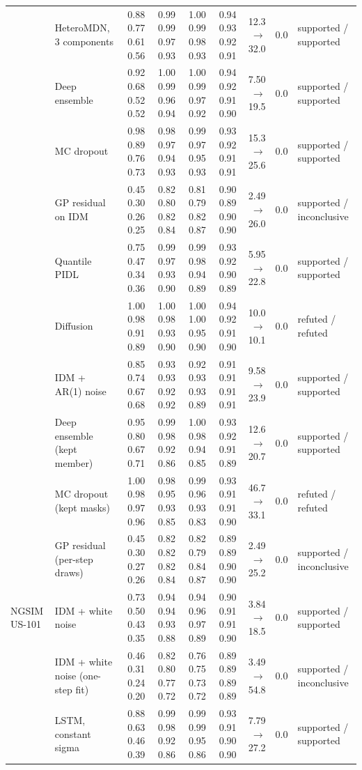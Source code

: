 \begin{longtable}{llrrrrrrl}
 & HeteroMDN, 3 components & 0.88 0.77 0.61 0.56 & 0.99 0.99 0.97 0.93 & 1.00 0.99 0.98 0.93 & 0.94 0.93 0.92 0.91 & 12.3 $\rightarrow$ 32.0 & 0.0 & supported / supported \\
 & Deep ensemble & 0.92 0.68 0.52 0.52 & 1.00 0.99 0.96 0.94 & 1.00 0.99 0.97 0.92 & 0.94 0.92 0.91 0.90 & 7.50 $\rightarrow$ 19.5 & 0.0 & supported / supported \\
 & MC dropout & 0.98 0.89 0.76 0.73 & 0.98 0.97 0.94 0.93 & 0.99 0.97 0.95 0.93 & 0.93 0.92 0.91 0.91 & 15.3 $\rightarrow$ 25.6 & 0.0 & supported / supported \\
 & GP residual on IDM & 0.45 0.30 0.26 0.25 & 0.82 0.80 0.82 0.84 & 0.81 0.79 0.82 0.87 & 0.90 0.89 0.90 0.90 & 2.49 $\rightarrow$ 26.0 & 0.0 & supported / inconclusive \\
 & Quantile PIDL & 0.75 0.47 0.34 0.36 & 0.99 0.97 0.93 0.90 & 0.99 0.98 0.94 0.89 & 0.93 0.92 0.90 0.89 & 5.95 $\rightarrow$ 22.8 & 0.0 & supported / supported \\
 & Diffusion & 1.00 0.98 0.91 0.89 & 1.00 0.98 0.93 0.90 & 1.00 1.00 0.95 0.90 & 0.94 0.92 0.91 0.90 & 10.0 $\rightarrow$ 10.1 & 0.0 & refuted / refuted \\
 & IDM + AR(1) noise & 0.85 0.74 0.67 0.68 & 0.93 0.93 0.92 0.92 & 0.92 0.93 0.93 0.89 & 0.91 0.91 0.91 0.91 & 9.58 $\rightarrow$ 23.9 & 0.0 & supported / supported \\
 & Deep ensemble (kept member) & 0.95 0.80 0.67 0.71 & 0.99 0.98 0.92 0.86 & 1.00 0.98 0.94 0.85 & 0.93 0.92 0.91 0.89 & 12.6 $\rightarrow$ 20.7 & 0.0 & supported / supported \\
 & MC dropout (kept masks) & 1.00 0.98 0.97 0.96 & 0.98 0.95 0.93 0.85 & 0.99 0.96 0.93 0.83 & 0.93 0.91 0.91 0.90 & 46.7 $\rightarrow$ 33.1 & 0.0 & refuted / refuted \\
 & GP residual (per-step draws) & 0.45 0.30 0.27 0.26 & 0.82 0.82 0.82 0.84 & 0.82 0.79 0.84 0.87 & 0.89 0.89 0.90 0.90 & 2.49 $\rightarrow$ 25.2 & 0.0 & supported / inconclusive \\
\midrule
NGSIM US-101 & IDM + white noise & 0.73 0.50 0.43 0.35 & 0.94 0.94 0.93 0.88 & 0.94 0.96 0.97 0.89 & 0.90 0.91 0.91 0.90 & 3.84 $\rightarrow$ 18.5 & 0.0 & supported / supported \\
 & IDM + white noise (one-step fit) & 0.46 0.31 0.24 0.20 & 0.82 0.80 0.77 0.72 & 0.76 0.75 0.73 0.72 & 0.89 0.89 0.89 0.89 & 3.49 $\rightarrow$ 54.8 & 0.0 & supported / inconclusive \\
 & LSTM, constant sigma & 0.88 0.63 0.46 0.39 & 0.99 0.98 0.92 0.86 & 0.99 0.99 0.95 0.86 & 0.93 0.91 0.90 0.90 & 7.79 $\rightarrow$ 27.2 & 0.0 & supported / supported \\

\end{longtable}
